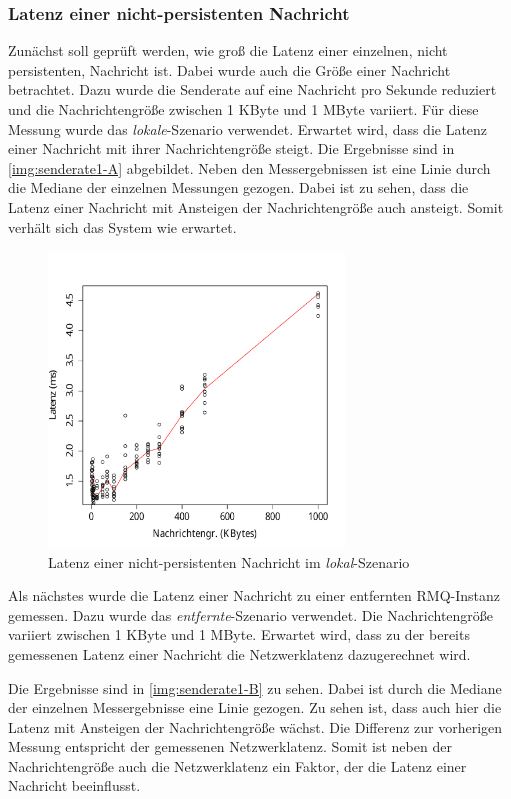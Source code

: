 \subsubsection{Latenz einer nicht-persistenten Nachricht}
\label{sec:oneMsgLatency}
Zunächst soll geprüft werden, wie groß die Latenz einer einzelnen, nicht persistenten, Nachricht ist. Dabei wurde auch die Größe einer Nachricht betrachtet. Dazu wurde die Senderate auf eine Nachricht pro Sekunde reduziert und die Nachrichtengröße zwischen 1 KByte und 1 MByte variiert. Für diese Messung wurde das \textit{lokale}-Szenario verwendet. Erwartet wird, dass die Latenz einer Nachricht mit ihrer Nachrichtengröße steigt.
Die Ergebnisse sind in \autoref{img:senderate1-A} abgebildet. Neben den Messergebnissen ist eine Linie durch die Mediane der einzelnen Messungen gezogen. Dabei ist zu sehen, dass die Latenz einer Nachricht mit Ansteigen der Nachrichtengröße auch ansteigt. Somit verhält sich das System wie erwartet.
\begin{figure}
\center
  \includegraphics[width=0.7\textwidth]{images/measurement/rate-limit-1-A.pdf}
  \caption{Latenz einer nicht-persistenten Nachricht im \textit{lokal}-Szenario}
  \label{img:senderate1-A}
\end{figure}

Als nächstes wurde die Latenz einer Nachricht zu einer entfernten RMQ-Instanz gemessen. Dazu wurde das \textit{entfernte}-Szenario verwendet. Die Nachrichtengröße variiert zwischen 1 KByte und 1 MByte. Erwartet wird, dass zu der bereits gemessenen Latenz einer Nachricht die Netzwerklatenz dazugerechnet wird.

Die Ergebnisse sind in \autoref{img:senderate1-B} zu sehen. Dabei ist durch die Mediane der einzelnen Messergebnisse eine Linie gezogen. Zu sehen ist, dass auch hier die Latenz mit Ansteigen der Nachrichtengröße wächst. Die Differenz zur vorherigen Messung entspricht der gemessenen Netzwerklatenz.
Somit ist neben der Nachrichtengröße auch die Netzwerklatenz ein Faktor, der die Latenz einer Nachricht beeinflusst.


